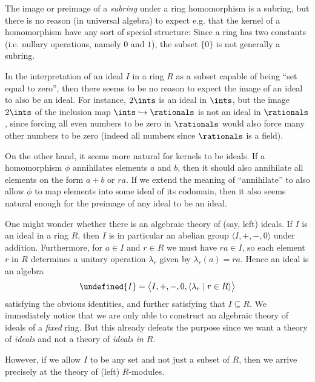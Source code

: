 \documentclass[article, a4paper, 11pt, oneside]{memoir}
\let\mathfrak\undefined
\numberwithin{equation}{chapter}
\theoremstyle{nonumberplain}
\begin{document}
\begin{remarkbreak}
    The image or preimage of a \emph{subring} under a ring homomorphism is a subring, but there is no reason (in universal algebra) to expect e.g. that the kernel of a homomorphism have any sort of special structure: Since a ring has two constants (i.e. nullary operations, namely $0$ and $1$), the subset $\{0\}$ is not generally a subring.

    In the interpretation of an ideal $I$ in a ring $R$ as a subset capable of being \enquote{set equal to zero}, then there seems to be no reason to expect the image of an ideal to also be an ideal. For instance, $2\ints$ is an ideal in $\ints$, but the image $2\ints$ of the inclusion map $\ints \hookrightarrow \rationals$ is not an ideal in $\rationals$, since forcing all even numbers to be zero in $\rationals$ would also force many other numbers to be zero (indeed all numbers since $\rationals$ is a field).

    On the other hand, it seems more natural for kernels to be ideals. If a homomorphism $\phi$ annihilates elements $a$ and $b$, then it should also annihilate all elements on the form $a + b$ or $ra$. If we extend the meaning of \enquote{annihilate} to also allow $\phi$ to map elements into some ideal of its codomain, then it also seems natural enough for the preimage of any ideal to be an ideal.
\end{remarkbreak}


\begin{remarkbreak}
    One might wonder whether there is an algebraic theory of (say, left) ideals. If $I$ is an ideal in a ring $R$, then $I$ is in particular an abelian group $\langle I, +, -, 0 \rangle$ under addition. Furthermore, for $a \in I$ and $r \in R$ we must have $ra \in I$, so each element $r$ in $R$ determines a unitary operation $\lambda_r$ given by $\lambda_r(a) = ra$. Hence an ideal is an algebra
    \begin{equation*}
        \mathfrak{I}
            = \bigl\langle I, +, -, 0, \langle \lambda_r \mid r \in R \rangle \bigr\rangle
    \end{equation*}
    satisfying the obvious identities, and further satisfying that $I \subseteq R$. We immediately notice that we are only able to construct an algebraic theory of ideals of a \emph{fixed} ring. But this already defeats the purpose since we want a theory of \emph{ideals} and not a theory of \emph{ideals in $R$}.

    However, if we allow $I$ to be any set and not just a subset of $R$, then we arrive precisely at the theory of (left) $R$-modules.
\end{remarkbreak}
\end{document}
